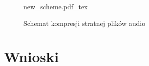 \documentclass[12pt]{oska}
\let\Oldsection\section
\renewcommand{\section}{\FloatBarrier\Oldsection}
\begin{document}
\begin{figure}[!tbh]
  \centering
  {new_scheme.pdf_tex}
  \caption{Schemat kompresji stratnej plików audio}
  \label{fig:new_scheme}
\end{figure}

\section{Wnioski}

\printbibliography
\end{document}
